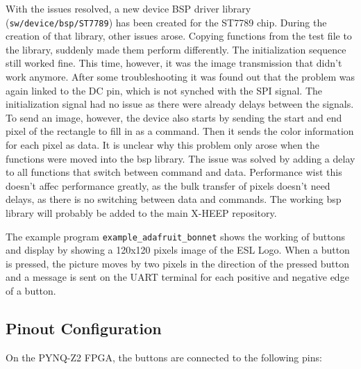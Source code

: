 With the issues resolved, a new device BSP driver library (\texttt{sw/device/bsp/ST7789}) \cite{projectRepo} has been created for the ST7789 chip. During the creation of that library, other issues arose. Copying functions from the test file to the library, suddenly made them perform differently. The initialization sequence still worked fine. This time, however, it was the image transmission that didn't work anymore. After some troubleshooting it was found out that the problem was again linked to the DC pin, which is not synched with the SPI signal. The initialization signal had no issue as there were already delays between the signals. To send an image, however, the device also starts by sending the start and end pixel of the rectangle to fill in as a command. Then it sends the color information for each pixel as data. It is unclear why this problem only arose when the functions were moved into the bsp library. The issue was solved by adding a delay to all functions that switch between command and data. Performance wist this doesn't affec performance greatly, as the bulk transfer of pixels doesn't need delays, as there is no switching between data and commands. The working bsp library will probably be added to the main X-HEEP repository.

The example program \texttt{example\_adafruit\_bonnet} shows the working of buttons and display by showing a 120x120 pixels image of the ESL Logo. When a button is pressed, the picture moves by two pixels in the direction of the pressed button and a message is sent on the UART terminal for each positive and negative edge of a button.

\newpage

\subsection{Pinout Configuration}

On the PYNQ-Z2 FPGA, the buttons are connected to the following pins:

